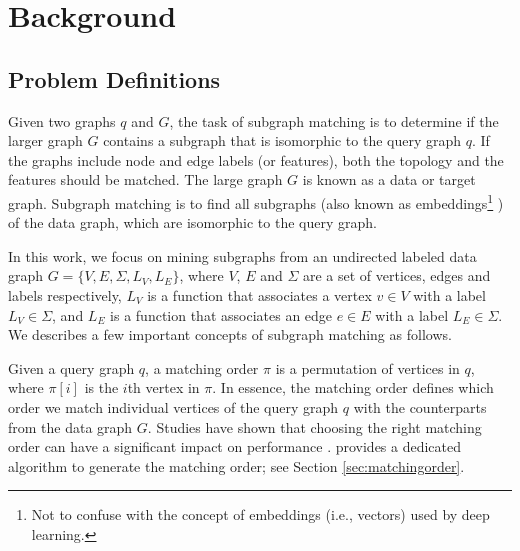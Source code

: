 \section{Background}
\subsection{Problem Definitions}
Given two graphs $q$ and $G$, the task of subgraph matching is to determine if the larger graph $G$ contains a subgraph that is isomorphic
to the query graph $q$. If the graphs include node and edge labels (or features), both the topology and the features should be matched. The
large graph $G$ is known as a data or target graph.  Subgraph matching is to find all subgraphs (also known as embeddings\footnote{Not to
confuse with the concept of embeddings (i.e., vectors) used by deep learning.} ) of the data graph, which are isomorphic to the query
graph.

In this work, we focus on mining subgraphs from an undirected labeled data graph $G=\{V,E,\Sigma,L_V,L_E\}$, where $V$, $E$ and $\Sigma$
are a set of vertices, edges and labels respectively,  $L_V$ is a function that associates a vertex $v \in V$ with a label $L_V \in
\Sigma$, and $L_E$ is a function that associates an edge $e \in E$ with a label $L_E \in \Sigma$. We describes a few important concepts of
subgraph matching as follows.



 Given a query graph $q$, a matching order $\pi$ is a permutation of vertices in $q$, where $\pi[i]$ is the
$i$th vertex in $\pi$. In essence, the matching order defines which order we match individual vertices of the query graph $q$ with the
counterparts from the data graph $G$. Studies have shown that choosing the right matching order can have a significant impact on
performance \cite{bi2016efficient,sun2020subgraph,sun2020rapidmatch,guo2020gpu}.  \SystemName provides a dedicated algorithm to generate
the matching order; see Section \ref {sec:matchingorder}.

